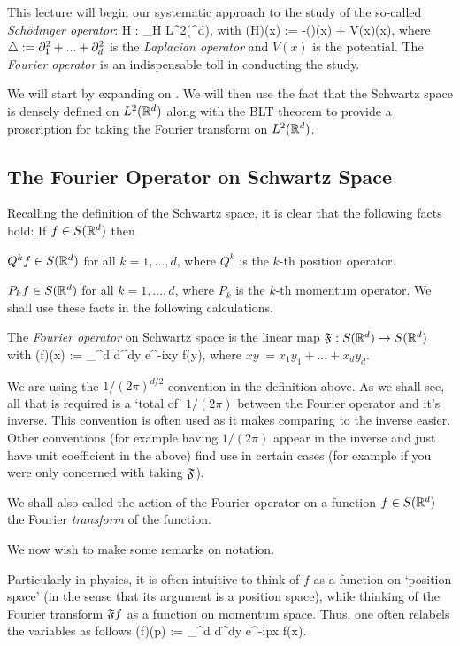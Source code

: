 This lecture will begin our systematic approach to the study of the so-called \emph{Sch\"{o}dinger operator}:
\bse 
H : \cD_H \to L^2(\R^d),
\ese 
with 
\bse 
(H\psi)(x) := -(\Laplace \psi)(x) + V(x)\psi(x),
\ese 
where $\mathop{}\!\mathbin\bigtriangleup := \partial_1^2+...+\partial_d^2$ is the \emph{Laplacian operator} and $V(x)$ is the potential. The \emph{Fourier operator} is an indispensable toll in conducting the study. 

We will start by expanding on . We will then use the fact that the Schwartz space is densely defined on $L^2(\mathbb{R}^d)$ along with the BLT theorem to provide a proscription for taking the Fourier transform on $L^2(\mathbb{R}^d)$.

\subsection{The Fourier Operator on Schwartz Space}

Recalling the definition of the Schwartz space, it is clear that the following facts hold: If $f\in S(\mathbb{R}^d)$ then 
\ben[label=(\roman*)]
\item $Q^kf\in S(\mathbb{R}^d)$ for all $k=1,...,d$, where $Q^k$ is the $k$-th position operator. 
\item $P_kf\in S(\mathbb{R}^d)$ for all $k=1,...,d$, where $P_k$ is the $k$-th momentum operator. 
\een 
We shall use these facts in the following calculations. 

\bd 
The \emph{Fourier operator} on Schwartz space is the linear map $\mathfrak{F}:S(\mathbb{R}^d) \to S(\mathbb{R}^d)$ with 
\bse
(\fF f)(x) :=  \int_{\R^d} d^dy e^{-ixy} f(y),
\ese 
where $xy := x_1y_1 + ... + x_dy_d$.
\ed 

\br 
We are using the $1/(2\pi)^{d/2}$ convention in the definition above. As we shall see, all that is required is a `total of' $1/(2\pi)$ between the Fourier operator and it's inverse. This convention is often used as it makes comparing to the inverse easier. Other conventions (for example having $1/(2\pi)$ appear in the inverse and just have unit coefficient in the above) find use in certain cases (for example if you were only concerned with taking $\mathfrak{F}$).
\er 

\br 
We shall also called the action of the Fourier operator on a function $f\in S(\mathbb{R}^d)$ the Fourier \emph{transform} of the function. 
\er 

We now wish to make some remarks on notation. 
\ben[label=(\roman*)]
\item Particularly in physics, it is often intuitive to think of $f$ as a function on `position space' (in the sense that its argument is a position space), while thinking of the Fourier transform $\mathfrak{F} f $ as a function on momentum space. Thus, one often relabels the variables as follows 
\bse 
(\fF f)(p) :=  \int_{\R^d} d^dy e^{-ipx} f(x).
\ese 

